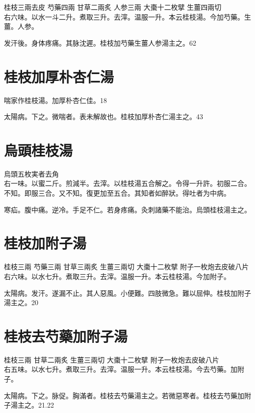 桂枝{\scriptsize 三兩去皮} 芍藥{\scriptsize 四兩} 甘草{\scriptsize 二兩炙} 人参{\scriptsize 三兩} 大棗{\scriptsize 十二枚擘} 生薑{\scriptsize 四兩切}\\
右六味。以水一斗二升。煮取三升。去滓。温服一升。本云桂枝湯。今加芍藥。生薑。人参。

发汗後。身体疼痛。其脉沈遲。桂枝加芍藥生薑人参湯主之。62

\section{桂枝加厚朴杏仁湯}

喘家作桂枝湯。加厚朴杏仁佳。18

太陽病。下之。微喘者。表未解故也。桂枝{\khaaitp 加厚朴杏仁}湯主之。43

\section{烏頭桂枝湯}

烏頭{\scriptsize 五枚実者去角}\\
右一味。以蜜二斤。煎減半。去滓。以桂枝湯五合解之。令得一升許。初服二合。不知。即服三合。又不知。復更加至五合。其知者如醉狀。得吐者为中病。

寒疝。腹中痛。逆冷。手足不仁。若身疼痛。灸刺諸藥不能治。烏頭桂枝湯主之。

\section{桂枝加附子湯}

桂枝{\scriptsize 三兩} 芍藥{\scriptsize 三兩} 甘草{\scriptsize 三兩炙} 生薑{\scriptsize 三兩切} 大棗{\scriptsize 十二枚擘} 附子{\scriptsize 一枚炮去皮破八片}\\
右六味。以水七升。煮取三升。去滓。温服一升。本云桂枝湯。今加附子。

太陽病。发汗。遂漏不止。其人惡風。小便難。四肢微急。難以屈伸。桂枝加附子湯主之。20

\section{桂枝去芍藥加附子湯}

桂枝{\scriptsize 三兩} 甘草{\scriptsize 二兩炙} 生薑{\scriptsize 三兩切} 大棗{\scriptsize 十二枚擘} 附子{\scriptsize 一枚炮去皮破八片}\\
右五味。以水七升。煮取三升。去滓。温服一升。本云桂枝湯。今去芍藥。加附子。

太陽病。下之。脉促。胸滿者。桂枝去芍藥湯主之。若微{\khaaitp 惡}寒者。桂枝去芍藥加附子湯主之。21.22

